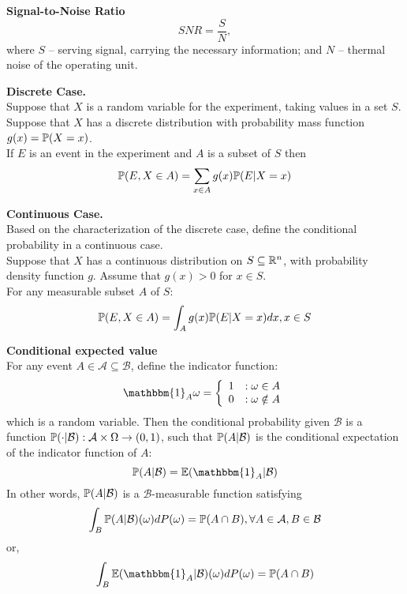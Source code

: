 \begin{framed}
\par{\bf Signal-to-Noise Ratio}
$$SNR=\frac{S}{N},$$ where $S$ -- serving signal, carrying the necessary information; and $N$ -- thermal noise of the operating unit.
\end{framed}
\begin{framed}
	\par {\bf Discrete Case.}
	\\Suppose that $X$ is a random variable for the experiment, taking values in a set $S$. Suppose that $X$ has a discrete distribution with probability mass function $g(x)=\P(X=x)$.
	\\If $E$ is an event in the experiment and $A$ is a subset of $S$ then
	\begin{equation}
		\P(E,X\in A)=\sum_{x\in A}g(x)\P(E|X=x)
	\end{equation}
\end{framed}

\begin{framed}
	\par {\bf Continuous Case.}
	\\Based on the characterization of the discrete case, define the conditional probability in a continuous case.
	\\Suppose that $X$ has a continuous distribution on $S\subseteq \R^n$, with probability density function $g$. Assume that $g(x)>0$ for $x\in S$.
	\\For any measurable subset $A$ of $S$:
	\begin{equation}
		\P(E,X\in A)=\int_A g(x)\P(E|X=x)dx,x\in S
	\end{equation}
\end{framed}

\begin{framed}
	\par {\bf Conditional expected value}
	\\For any event $A\in\mathcal{A}\subseteq\mathcal{B}$, define the indicator function:
	\begin{displaymath}
		\mathbbm{1}_A{\omega}=\left\{
			\begin{array}{lr}
			1 & : \omega\in A\\
			0 & : \omega\notin A
			\end{array}
		\right.
	\end{displaymath}
	which is a random variable. Then the conditional probability given $\mathcal{B}$ is a function $\P(\cdot|\mathcal{B}):\mathcal{A}\times\Omega\rightarrow(0,1)$, such that $\P(A|\mathcal{B})$ is the conditional expectation of the indicator function of $A$:
	$$\P(A|\mathcal{B})=\E(\mathbbm{1}_A|\mathcal{B})$$
	In other words, $\P(A|\mathcal{B})$ is a $\mathcal{B}$-measurable function satisfying
	\begin{equation}
		\int_{B}\P(A|\mathcal{B})(\omega)dP(\omega)=\P(A\cap B), \forall A\in\mathcal{A},B\in\mathcal{B}
	\end{equation}
	or,
	\begin{equation}
		\int_{B}\E(\mathbbm{1}_A|\mathcal{B})(\omega)dP(\omega)=\P(A\cap B)
	\end{equation}
\end{framed}

